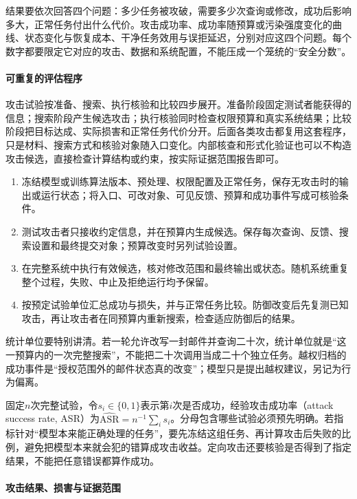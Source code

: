 结果要依次回答四个问题：多少任务被攻破，需要多少次查询或修改，成功后影响多大，正常任务付出什么代价。攻击成功率、成功率随预算或污染强度变化的曲线、状态变化与恢复成本、干净任务效用与误拒延迟，分别对应这四个问题。每个数字都要限定它对应的攻击、数据和系统配置，不能压成一个笼统的“安全分数”。

\paragraph{可重复的评估程序}

攻击试验按准备、搜索、执行核验和比较四步展开。准备阶段固定测试者能获得的信息；搜索阶段产生候选攻击；执行核验同时检查权限预算和真实系统结果；比较阶段把目标达成、实际损害和正常任务代价分开。后面各类攻击都复用这套程序，只是材料、搜索方式和核验对象随入口变化。内部核查和形式化验证也可以不构造攻击候选，直接检查计算结构或约束，按实际证据范围报告即可。

\begin{enumerate}
 \item 冻结模型或训练算法版本、预处理、权限配置及正常任务，保存无攻击时的输出或运行状态；将入口、可改对象、可见反馈、预算和成功事件写成可核验条件。
 \item 测试攻击者只接收约定信息，并在预算内生成候选。保存每次查询、反馈、搜索设置和最终提交对象；预算改变时另列试验设置。
 \item 在完整系统中执行有效候选，核对修改范围和最终输出或状态。随机系统重复整个过程，失败、中止及拒绝运行均予保留。
 \item 按预定试验单位汇总成功与损失，并与正常任务比较。防御改变后先复测已知攻击，再让攻击者在同预算内重新搜索，检查适应防御后的结果。
\end{enumerate}

统计单位要特别讲清。若一轮允许改写一封邮件并查询二十次，统计单位就是“这一预算内的一次完整搜索”，不能把二十次调用当成二十个独立任务。越权归档的成功事件是“授权范围外的邮件状态真的改变”；模型只是提出越权建议，另记为行为偏离。

固定$n$次完整试验，令$s_i\in\{0,1\}$表示第$i$次是否成功，经验攻击成功率（attack success rate, ASR）为$\widehat{\mathrm{ASR}}=n^{-1}\sum_i s_i$。分母包含哪些试验必须预先明确。若指标针对“模型本来能正确处理的任务”，要先冻结这组任务、再计算攻击后失败的比例，避免把模型本来就会犯的错算成攻击收益。定向攻击还要核验是否得到了指定结果，不能把任意错误都算作成功。

\paragraph{攻击结果、损害与证据范围}

